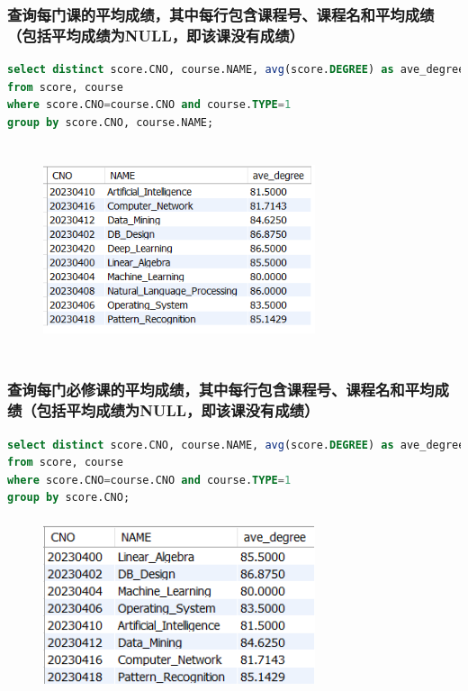\documentclass{ctexart}
\begin{document}
\subsubsection{查询每门课的平均成绩，其中每行包含课程号、课程名和平均成绩（包括平均成绩为NULL，即该课没有成绩）}
\begin{lstlisting}[language=sql]
select distinct score.CNO, course.NAME, avg(score.DEGREE) as ave_degree
from score, course
where score.CNO=course.CNO and course.TYPE=1
group by score.CNO, course.NAME;
\end{lstlisting}
\begin{figure}[H]
	\centering 
	\includegraphics[height=6.2cm,width=8cm]{33.png}
	\end{figure}
\subsubsection{查询每门必修课的平均成绩，其中每行包含课程号、课程名和平均成绩（包括平均成绩为NULL，即该课没有成绩）}
\begin{lstlisting}[language=sql]
select distinct score.CNO, course.NAME, avg(score.DEGREE) as ave_degree
from score, course
where score.CNO=course.CNO and course.TYPE=1
group by score.CNO;
\end{lstlisting}
\begin{figure}[H]
	\centering 
	\includegraphics[height=5cm,width=8cm]{34.png}
	\end{figure}
\end{document}
